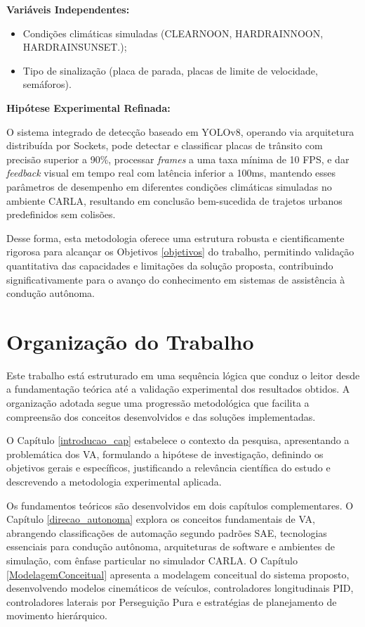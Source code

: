 \documentclass[
	12pt,				%
	oneside, %
	a4paper,			%
	english,			%
	french,				%
	spanish,			%
	brazil				%
	]{abntex2}
\begin{document}
\textbf{Variáveis Independentes:}
\begin{itemize}
\item Condições climáticas simuladas (CLEARNOON, HARDRAINNOON, HARDRAINSUNSET.);
\item Tipo de sinalização (placa de parada, placas de limite de velocidade, semáforos).
\end{itemize}

\textbf{Hipótese Experimental Refinada:}

O sistema integrado de detecção baseado em YOLOv8, operando via arquitetura distribuída por Sockets, pode detectar e classificar placas de trânsito com precisão superior a 90\%, processar \textit{frames} a uma taxa mínima de 10 FPS, e dar \textit{feedback} visual em tempo real com latência inferior a 100ms, mantendo esses parâmetros de desempenho em diferentes condições climáticas simuladas no ambiente CARLA, resultando em conclusão bem-sucedida de trajetos urbanos predefinidos sem colisões.

Desse forma, esta metodologia oferece uma estrutura robusta e cientificamente rigorosa para alcançar os Objetivos \ref{objetivos} do trabalho, permitindo validação quantitativa das capacidades e limitações da solução proposta, contribuindo significativamente para o avanço do conhecimento em sistemas de assistência à condução autônoma.

\section{Organização do Trabalho}

Este trabalho está estruturado em uma sequência lógica que conduz o leitor desde a fundamentação teórica até a validação experimental dos resultados obtidos. A organização adotada segue uma progressão metodológica que facilita a compreensão dos conceitos desenvolvidos e das soluções implementadas.

O Capítulo \ref{introducao_cap} estabelece o contexto da pesquisa, apresentando a problemática dos VA, formulando a hipótese de investigação, definindo os objetivos gerais e específicos, justificando a relevância científica do estudo e descrevendo a metodologia experimental aplicada.

Os fundamentos teóricos são desenvolvidos em dois capítulos complementares. O Capítulo \ref{direcao_autonoma} explora os conceitos fundamentais de VA, abrangendo classificações de automação segundo padrões SAE, tecnologias essenciais para condução autônoma, arquiteturas de software e ambientes de simulação, com ênfase particular no simulador CARLA. O Capítulo \ref{ModelagemConceitual} apresenta a modelagem conceitual do sistema proposto, desenvolvendo modelos cinemáticos de veículos, controladores longitudinais PID, controladores laterais por Perseguição Pura e estratégias de planejamento de movimento hierárquico.
\end{document}
